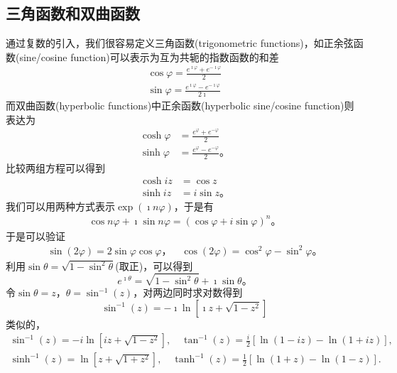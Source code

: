 \subsection{三角函数和双曲函数}
通过复数的引入，我们很容易定义三角函数(trigonometric functions)，如正余弦函数(sine/cosine function)可以表示为互为共轭的指数函数的和差
\begin{align}
    \cos \varphi = \frac{e^{\imath \varphi} + e^{ -\imath \varphi} }{2}
    \\
    \sin \varphi = \frac{e^{\imath \varphi} - e^{ -\imath \varphi} }{2\imath}
\end{align}
而双曲函数(hyperbolic functions)中正余函数(hyperbolic sine/cosine function)则表达为
\begin{align}
    \cosh \varphi &= \frac{e^{\varphi} + e^{ - \varphi} }{2}
    \\
    \sinh \varphi &= \frac{e^{\varphi} - e^{ - \varphi} }{2} \textrm{。}
\end{align}
比较两组方程可以得到
\begin{align}
    \cosh iz &= \cos z
    \\
    \sinh iz &= i \sin z\textrm{。}
\end{align}
我们可以用两种方式表示$\exp(\imath n \varphi)$，于是有
\begin{align}
    \cos n \varphi + \imath \sin n\varphi = (\cos \varphi + i \sin \varphi)^n  \textrm{。}
\end{align}
于是可以验证
\begin{align}
    \sin(2\varphi) = 2\sin\varphi \cos\varphi\textrm{，} \quad \cos (2\varphi) = \cos^2\varphi - \sin^2\varphi \textrm{。}
\end{align}
利用$\sin \theta = \sqrt{1 - \sin ^2 \theta }$(取正)，可以得到
\begin{equation}
  e^{\imath \theta} = \sqrt{ 1 - \sin ^2 \theta } + \imath \sin \theta \textrm{。}  
\end{equation} 
令$\sin \theta = z$，$\theta = \sin^{-1} (z)$，对两边同时求对数得到
\begin{equation}
    \sin^{-1} (z) = -\imath \ln \left[ \imath z + \sqrt{1-z^2} \right]
\end{equation}
类似的，
\begin{equation}
    \begin{array}{cc}
    \sin ^{-1}(z)=-i \ln \left[i z+\sqrt{1-z^2}\right], \quad \tan ^{-1}(z)=\frac{i}{2}[\ln (1-i z)-\ln (1+i z)], \\
    \sinh ^{-1}(z)=\ln \left[z+\sqrt{1+z^2}\right], \quad \tanh ^{-1}(z)=\frac{1}{2}[\ln (1+z)-\ln (1-z)] .
    \end{array}
\end{equation}

